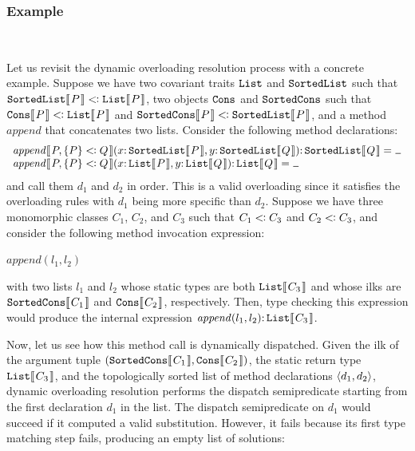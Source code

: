 \subsubsection{Example}\label{sec:ex}~\par
Let us revisit the dynamic overloading resolution process with a concrete example.
Suppose we have two covariant traits $\mathtt{List}$ and $\mathtt{SortedList}$
such that $\kwd{SortedList}\ob{P} \extends \kwd{List}\ob{P}$,
two objects $\mathtt{Cons}$ and $\mathtt{SortedCons}$ such that
$\kwd{Cons}\ob{P} \extends \kwd{List}\ob{P}$ and
$\kwd{SortedCons}\ob{P} \extends \kwd{SortedList}\ob{P}$, and
a method $\mathit{append}$ that concatenates two lists.
Consider the following method declarations:
\[
\begin{array}{l}
\mathit{append}\ob{P, \bd{P} \extends Q}(x \COLON \kwd{SortedList}\ob{P}, y \COLON \kwd{SortedList}\ob{Q}) \COLON \kwd{SortedList}\ob{Q} = \dontcare\\
\mathit{append}\ob{P,\bd{P} \extends Q}(x \COLON \kwd{List}\ob{P}, y \COLON \kwd{List}\ob{Q}) \COLON \kwd{List}\ob{Q} = \dontcare
\end{array}
\]
and call them $d_1$ and $d_2$ in order.  This is a valid overloading
since it satisfies the overloading rules with $d_1$ being more specific
than $d_2$.  Suppose we have three monomorphic classes $C_1$, $C_2$,
and $C_3$ such that $C_1 \subtypeof C_3$ and $C_2  \subtypeof C_3$, and
consider the following method invocation expression:
\begin{center}
$\mathit{append}(l_1, l_2)$
\end{center}
with two lists $l_1$ and $l_2$ whose static types are both
$\kwd{List}\ob{C_3}$ and whose ilks are $\kwd{SortedCons}\ob{C_1}$ and
$\kwd{Cons}\ob{C_2}$, respectively.  Then, type checking this expression
would produce the internal expression $\mathit{append}(l_1, l_2) \COLON \kwd{List}\ob{C_3}$.

Now, let us see how this method call is dynamically dispatched.
Given the ilk of the argument tuple
$\tuple{\kwd{SortedCons}\ob{C_1},\kwd{Cons}\ob{C_2}}$,
the static return type $\kwd{List}\ob{C_3}$, and the topologically sorted
list of method declarations $\listof{d_1, d_2}$, dynamic overloading resolution
performs the dispatch semipredicate starting from the first declaration $d_1$
in the list.
The dispatch semipredicate on $d_1$ would succeed if it computed a valid substitution.
However, it fails because its first type matching step fails, producing an empty list of solutions:
\medskip

